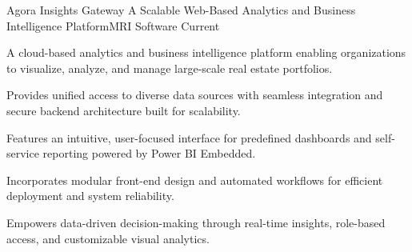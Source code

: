 \resumeProject
  {Agora Insights Gateway}
  {A Scalable Web-Based Analytics and Business Intelligence Platform}{MRI Software}
  {Current}
  \resumeItemListStart
      \item{A cloud-based analytics and business intelligence platform enabling organizations to visualize, analyze, and manage large-scale real estate portfolios.}
      \item{Provides unified access to diverse data sources with seamless integration and secure backend architecture built for scalability.}
      \item{Features an intuitive, user-focused interface for predefined dashboards and self-service reporting powered by Power BI Embedded.}
      \item{Incorporates modular front-end design and automated workflows for efficient deployment and system reliability.}
      \item{Empowers data-driven decision-making through real-time insights, role-based access, and customizable visual analytics.}
  \resumeItemListEnd
\vspace{2mm}
